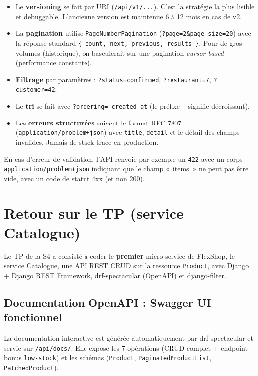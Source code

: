 \documentclass[11pt,a4paper]{article}
\begin{document}
\begin{itemize}
  \item Le \textbf{versioning} se fait par URI (\texttt{/api/v1/...}). C'est la stratégie la plus lisible et debuggable. L'ancienne version est maintenue 6 à 12 mois en cas de v2.
  \item La \textbf{pagination} utilise \texttt{PageNumberPagination} (\texttt{?page=2\&page\_size=20}) avec la réponse standard \texttt{\{ count, next, previous, results \}}. Pour de gros volumes (historique), on basculerait sur une pagination \emph{cursor-based} (performance constante).
  \item \textbf{Filtrage} par paramètres : \texttt{?status=confirmed}, \texttt{?restaurant=7}, \texttt{?customer=42}.
  \item Le \textbf{tri} se fait avec \texttt{?ordering=-created\_at} (le préfixe \texttt{-} signifie décroissant).
  \item Les \textbf{erreurs structurées} suivent le format RFC 7807 (\texttt{application/problem+json}) avec \texttt{title}, \texttt{detail} et le détail des champs invalides. Jamais de stack trace en production.
\end{itemize}

En cas d'erreur de validation, l'API renvoie par exemple un \texttt{422} avec un corps \texttt{application/problem+json} indiquant que le champ «~items~» ne peut pas être vide, avec un code de statut 4xx (et non 200).

\newpage
\section{Retour sur le TP (service Catalogue)}

Le TP de la S4 a consisté à coder le \textbf{premier} micro-service de FlexShop, le service Catalogue, une API REST CRUD sur la ressource \texttt{Product}, avec Django + Django REST Framework, drf-spectacular (OpenAPI) et django-filter.

\subsection{Documentation OpenAPI : Swagger UI fonctionnel}

La documentation interactive est générée automatiquement par drf-spectacular et servie sur \texttt{/api/docs/}. Elle expose les 7 opérations (CRUD complet + endpoint bonus \texttt{low-stock}) et les schémas (\texttt{Product}, \texttt{PaginatedProductList}, \texttt{PatchedProduct}).
\end{document}
